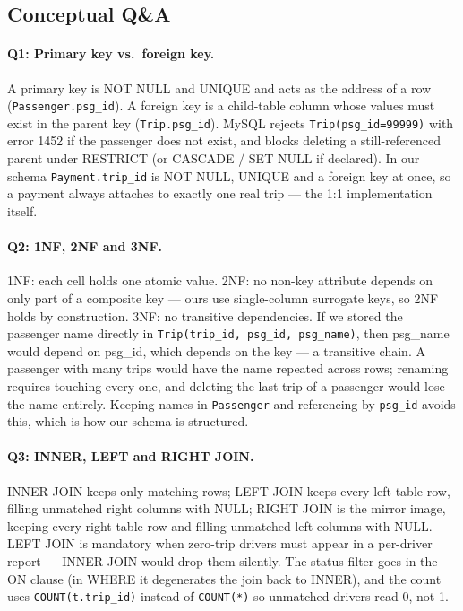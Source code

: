 \subsection{Conceptual Q\&A}

\paragraph{Q1: Primary key vs.\ foreign key.}
A primary key is NOT NULL and UNIQUE and acts as the address of a row (\texttt{Passenger.psg\_id}). A foreign key is a child-table column whose values must exist in the parent key (\texttt{Trip.psg\_id}). MySQL rejects \texttt{Trip(psg\_id=99999)} with error 1452 if the passenger does not exist, and blocks deleting a still-referenced parent under RESTRICT (or CASCADE / SET NULL if declared). In our schema \texttt{Payment.trip\_id} is NOT NULL, UNIQUE and a foreign key at once, so a payment always attaches to exactly one real trip --- the 1:1 implementation itself.

\paragraph{Q2: 1NF, 2NF and 3NF.}
1NF: each cell holds one atomic value. 2NF: no non-key attribute depends on only part of a composite key --- ours use single-column surrogate keys, so 2NF holds by construction. 3NF: no transitive dependencies. If we stored the passenger name directly in \texttt{Trip(trip\_id, psg\_id, psg\_name)}, then psg\_name would depend on psg\_id, which depends on the key --- a transitive chain. A passenger with many trips would have the name repeated across rows; renaming requires touching every one, and deleting the last trip of a passenger would lose the name entirely. Keeping names in \texttt{Passenger} and referencing by \texttt{psg\_id} avoids this, which is how our schema is structured.

\paragraph{Q3: INNER, LEFT and RIGHT JOIN.}
INNER JOIN keeps only matching rows; LEFT JOIN keeps every left-table row, filling unmatched right columns with NULL; RIGHT JOIN is the mirror image, keeping every right-table row and filling unmatched left columns with NULL. LEFT JOIN is mandatory when zero-trip drivers must appear in a per-driver report --- INNER JOIN would drop them silently. The status filter goes in the ON clause (in WHERE it degenerates the join back to INNER), and the count uses \texttt{COUNT(t.trip\_id)} instead of \texttt{COUNT(*)} so unmatched drivers read 0, not 1.


